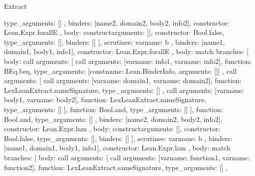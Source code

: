 \begin{lexlean}{Extract}
\begin{toolingmodule}
{{{{{{{                    type_arguments: []
                  },
                  binders: [name2, domain2, body2, info2],
                  constructor: Lean.Expr.forallE
                },
                {
                  body: construct{arguments: [], constructor: Bool.false, type_arguments: []},
                  binders: []
                }
              ],
              scrutinee: var{name: b}
            },
            binders: [name1, domain1, body1, info1],
            constructor: Lean.Expr.forallE
          },
          {
            body: match{
              branches: [
                {
                  body: call{
                    arguments: [
                      call{
                        arguments: [var{name: info1}, var{name: info2}],
                        function: BEq.beq,
                        type_arguments: [const{name: Lean.BinderInfo, arguments: []}]
                      },
                      call{
                        arguments: [
                          call{
                            arguments: [var{name: domain1}, var{name: domain2}],
                            function: LexLeanExtract.sameSignature,
                            type_arguments: []
                          },
                          call{
                            arguments: [var{name: body1}, var{name: body2}],
                            function: LexLeanExtract.sameSignature,
                            type_arguments: []
                          }
                        ],
                        function: Bool.and,
                        type_arguments: []
                      }
                    ],
                    function: Bool.and,
                    type_arguments: []
                  },
                  binders: [name2, domain2, body2, info2],
                  constructor: Lean.Expr.lam
                },
                {
                  body: construct{arguments: [], constructor: Bool.false, type_arguments: []},
                  binders: []
                }
              ],
              scrutinee: var{name: b}
            },
            binders: [name1, domain1, body1, info1],
            constructor: Lean.Expr.lam
          },
          {
            body: match{
              branches: [
                {
                  body: call{
                    arguments: [
                      call{
                        arguments: [var{name: function1}, var{name: function2}],
                        function: LexLeanExtract.sameSignature,
                        type_arguments: []
                      },
}}}}}}}
\end{toolingmodule}
\end{lexlean}
